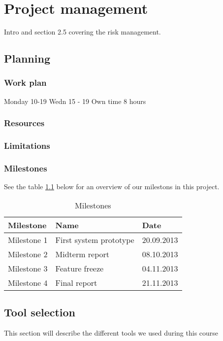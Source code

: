 \chapter{Project management}
\label{Project management} 

Intro
and section 2.5 covering the risk management.
\section{Planning}

\subsection{Work plan}
Monday 10-19
Wedn 15 - 19
Own time 8 hours

\subsection{Resources}

\subsection{Limitations}

\subsection{Milestones}

See the table \ref{table:milestones} below for an overview of our milestons in this project.

\begin{table}
\begin{center}
\begin{tabular}{ l | l | l }
  \hline
  Milestone & Name & Date \\
  \hline\noalign{\smallskip}\noalign{\smallskip}\hline
   Milestone 1 & First system prototype & 20.09.2013 \\
   Milestone 2 & Midterm report & 08.10.2013 \\
   Milestone 3 & Feature freeze & 04.11.2013 \\
   Milestone 4 & Final report & 21.11.2013 \\
  \hline
\end{tabular}
\end{center}
\caption{Milestones}
\label{table:milestones}
\end{table}

\section{Tool selection}
This section will describe the different tools we used during this course

